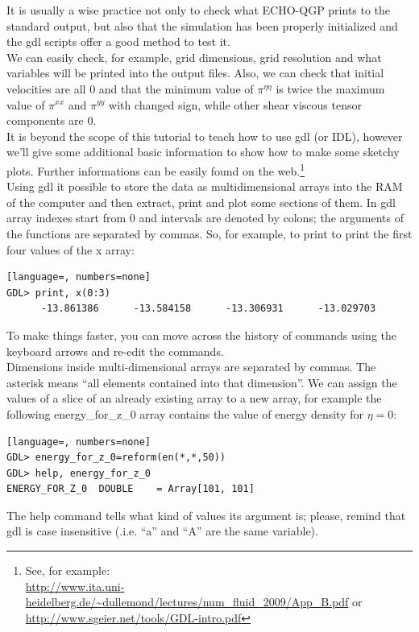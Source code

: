 It is usually a wise practice not only to check what ECHO-QGP prints to the standard output, but also that the simulation has been properly initialized and the gdl scripts offer a good method to test it.\\
We can easily check, for example, grid dimensions, grid resolution and what variables will be printed into the output files. Also, we can check that initial velocities are all 0 and that the minimum value of $\pi^{\eta\eta}$ is twice the maximum value of $\pi^{xx}$ and $\pi^{yy}$ with changed sign, while other shear viscous tensor components are 0.\\
It is beyond the scope of this tutorial to teach how to use gdl (or IDL), however we'll give some additional basic information to show how to make some sketchy plots. Further informations can be easily found on the web.\footnote{See, for example:\\ \url{http://www.ita.uni-heidelberg.de/~dullemond/lectures/num\_fluid_2009/App_B.pdf} or \url{http://www.sgeier.net/tools/GDL-intro.pdf}}\\
Using gdl it possible to store the data as multidimensional arrays into the RAM of the computer and then extract, print and plot some sections of them. In gdl array indexes start from 0 and intervals are denoted by colons; the arguments of the functions are separated by commas. So, for example, to print to print the first four values of the x array:
\begin{lstlisting}[language=, numbers=none]
GDL> print, x(0:3)
      -13.861386      -13.584158      -13.306931      -13.029703
\end{lstlisting}
To make things faster, you can move across the history of commands using the keyboard arrows and re-edit the commands.\\
Dimensions inside multi-dimensional arrays are separated by commas. The asterisk means ``all elements contained into that dimension''. We can assign the values of a slice of an already existing array to a new array, for example the following energy\_for\_z\_0 array contains the value of energy density for $\eta=0$:
\begin{lstlisting}[language=, numbers=none]
GDL> energy_for_z_0=reform(en(*,*,50))
GDL> help, energy_for_z_0
ENERGY_FOR_Z_0  DOUBLE    = Array[101, 101]
\end{lstlisting}
The help command tells what kind of values its argument is; please, remind that gdl is case insensitive (.i.e. ``a'' and ``A'' are the same variable).\\
